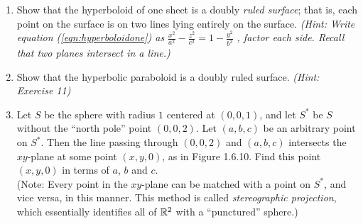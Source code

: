 \begin{enumerate}[\bfseries 1.]
\item Show that the hyperboloid of one sheet is a doubly
\emph{ruled surface}; 
that is, each point on the surface is on two lines lying entirely on the surface.
\emph{(Hint: Write equation (\ref{eqn:hyperboloidone}) as} $\frac{x^2}{a^2} - \frac{z^2}{c^2} = 1 -
  \frac{y^2}{b^2}$ \emph{, factor each side. Recall that two planes intersect in a line.)}
 \item Show that the hyperbolic paraboloid is a doubly ruled surface. \emph{(Hint: Exercise 11)}
 \piccaption[]{}
 \item Let $S$ be the sphere with radius $1$ centered at $(0,0,1)$, and let $S^*$ be $S$ without the
  ``north pole'' point $(0,0,2)$. 
  Let $(a,b,c)$ be an arbitrary point on $S^*$. 
  Then the line passing through $(0,0,2)$ and $(a,b,c)$ intersects the $xy$-plane at some point $(x,y,0)$, as in Figure 1.6.10.
  Find this point $(x,y,0)$ in terms of $a$, $b$ and
  $c$.\\(Note: Every point in the $xy$-plane can be matched with a point on $S^*$, and
  vice versa, in this manner. 
  This method is called \emph{stereographic projection},
  which essentially identifies all of $\mathbb{R}^{2}$ with a ``punctured'' sphere.)
  

\end{enumerate}
